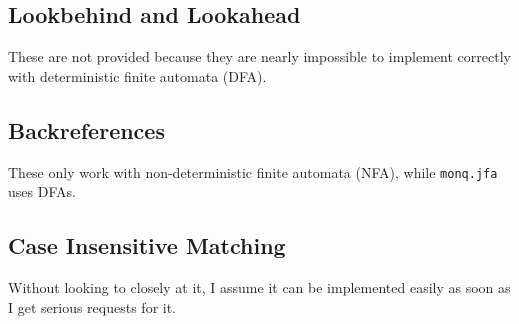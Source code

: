 \documentclass[12pt,a4paper,halfparskip]{scrartcl}
\newcommand{\monqjfa}{\texttt{monq.jfa}\xspace}
\begin{document}
\subsection{Lookbehind and Lookahead}
These are not provided because they are nearly impossible to
implement correctly with deterministic finite automata (DFA).

\subsection{Backreferences}
These only work with non-deterministic finite automata (NFA), while
\monqjfa uses DFAs.

\subsection{Case Insensitive Matching}
Without looking to closely at it, I assume it can be implemented easily
as soon as I get serious requests for it.



\end{document}
